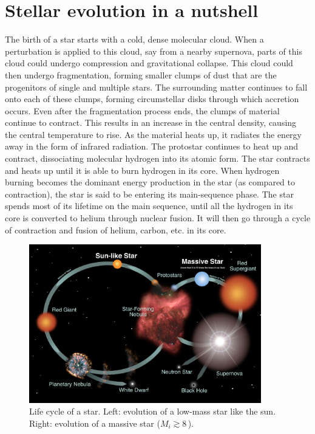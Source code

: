 \section{Stellar evolution in a nutshell}

The birth of a star starts with a cold, dense molecular cloud. When a perturbation is applied to this cloud, say from a nearby supernova, parts of this cloud could undergo compression and gravitational collapse. This cloud could then undergo fragmentation, forming smaller clumps of dust that are the progenitors of single and multiple stars. The surrounding matter continues to fall onto each of these clumps, forming circumstellar disks through which accretion occurs. Even after the fragmentation process ends, the clumps of material continue to contract. This results in an increase in the central density, causing the central temperature to rise. As the material heats up, it radiates the energy away in the form of infrared radiation. The protostar continues to heat up and contract, dissociating molecular hydrogen into its atomic form. The star contracts and heats up until it is able to burn hydrogen in its core. When hydrogen burning becomes the dominant energy production in the star (as compared to contraction), the star is said to be entering its main-sequence phase. The star spends most of its lifetime on the main sequence, until all the hydrogen in its core is converted to helium through nuclear fusion. It will then go through a cycle of contraction and fusion of helium, carbon, etc. in its core.

\begin{figure}
    \centering
    \includegraphics[width=0.9\textwidth]{chapters/introduction/image/stars_lifecycle_full.jpeg}
    \caption{Life cycle of a star. Left: evolution of a low-mass star like the sun. Right: evolution of a massive star ($M_i \gtrsim8\,$\Msun{}).}
    \label{fig:lifecycle}
\end{figure}
 
